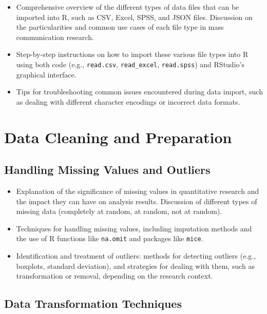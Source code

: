 \documentclass[
]{book}
\begin{document}
\begin{itemize}
\item
  Comprehensive overview of the different types of data files that can be imported into R, such as CSV, Excel, SPSS, and JSON files. Discussion on the particularities and common use cases of each file type in mass communication research.
\item
  Step-by-step instructions on how to import these various file types into R using both code (e.g., \texttt{read.csv}, \texttt{read\_excel}, \texttt{read.spss}) and RStudio's graphical interface.
\item
  Tips for troubleshooting common issues encountered during data import, such as dealing with different character encodings or incorrect data formats.
\end{itemize}

\hypertarget{data-cleaning-and-preparation}{%
\section*{Data Cleaning and Preparation}\label{data-cleaning-and-preparation}}

\hypertarget{handling-missing-values-and-outliers}{%
\subsection*{Handling Missing Values and Outliers}\label{handling-missing-values-and-outliers}}

\begin{itemize}
\item
  Explanation of the significance of missing values in quantitative research and the impact they can have on analysis results. Discussion of different types of missing data (completely at random, at random, not at random).
\item
  Techniques for handling missing values, including imputation methods and the use of R functions like \texttt{na.omit} and packages like \texttt{mice}.
\item
  Identification and treatment of outliers: methods for detecting outliers (e.g., boxplots, standard deviation), and strategies for dealing with them, such as transformation or removal, depending on the research context.
\end{itemize}

\hypertarget{data-transformation-techniques}{%
\subsection*{Data Transformation Techniques}\label{data-transformation-techniques}}
\end{document}
